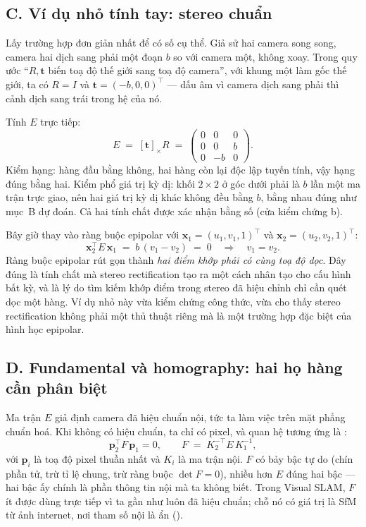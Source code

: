 \documentclass[../../vslam.tex]{subfiles}
\begin{document}
\subsection{C. Ví dụ nhỏ tính tay: stereo chuẩn}

Lấy trường hợp đơn giản nhất để có số cụ thể. Giả sử hai camera song song, camera hai dịch sang phải một đoạn \(b\) so với camera một, không xoay. Trong quy ước ``\(R, \mathbf{t}\) biến toạ độ thế giới sang toạ độ camera'', với khung một làm gốc thế giới, ta có \(R = I\) và \(\mathbf{t} = (-b, 0, 0)^{\top}\) --- dấu âm vì camera dịch sang phải thì cảnh dịch sang trái trong hệ của nó.

Tính \(E\) trực tiếp:
\[
E \;=\; [\mathbf{t}]_\times R \;=\;
\begin{pmatrix} 0 & 0 & 0 \\ 0 & 0 & b \\ 0 & -b & 0 \end{pmatrix} .
\]
Kiểm hạng: hàng đầu bằng không, hai hàng còn lại độc lập tuyến tính, vậy hạng đúng bằng hai. Kiểm phổ giá trị kỳ dị: khối \(2\times 2\) ở góc dưới phải là \(b\) lần một ma trận trực giao, nên hai giá trị kỳ dị khác không đều bằng \(b\), bằng nhau đúng như mục~B dự đoán. Cả hai tính chất được xác nhận bằng số (cửa kiểm chứng b).

Bây giờ thay vào ràng buộc epipolar với \(\mathbf{x}_1 = (u_1, v_1, 1)^{\top}\) và \(\mathbf{x}_2 = (u_2, v_2, 1)^{\top}\):
\[
\mathbf{x}_2^{\top} E\, \mathbf{x}_1 \;=\; b\,(v_1 - v_2) \;=\; 0
\quad\Longrightarrow\quad v_1 = v_2 .
\]
Ràng buộc epipolar rút gọn thành \emph{hai điểm khớp phải có cùng toạ độ dọc}. Đây đúng là tính chất mà stereo rectification tạo ra một cách nhân tạo cho cấu hình bất kỳ, và là lý do tìm kiếm khớp điểm trong stereo đã hiệu chỉnh chỉ cần quét dọc một hàng. Ví dụ nhỏ này vừa kiểm chứng công thức, vừa cho thấy stereo rectification không phải một thủ thuật riêng mà là một trường hợp đặc biệt của hình học epipolar.

\subsection{D. Fundamental và homography: hai họ hàng cần phân biệt}

Ma trận \(E\) giả định camera đã hiệu chuẩn nội, tức ta làm việc trên mặt phẳng chuẩn hoá. Khi không có hiệu chuẩn, ta chỉ có pixel, và quan hệ tương ứng là :
\[
\mathbf{p}_2^{\top} F\, \mathbf{p}_1 = 0,
\qquad
F \;=\; K_2^{-\top} E\, K_1^{-1},
\]
với \(\mathbf{p}_i\) là toạ độ pixel thuần nhất và \(K_i\) là ma trận nội. \(F\) có bảy bậc tự do (chín phần tử, trừ tỉ lệ chung, trừ ràng buộc \(\det F = 0\)), nhiều hơn \(E\) đúng hai bậc --- hai bậc ấy chính là phần thông tin nội mà ta không biết. Trong Visual SLAM, \(F\) ít được dùng trực tiếp vì ta gần như luôn đã hiệu chuẩn; chỗ nó có giá trị là SfM từ ảnh internet, nơi tham số nội là ẩn ().
\end{document}
